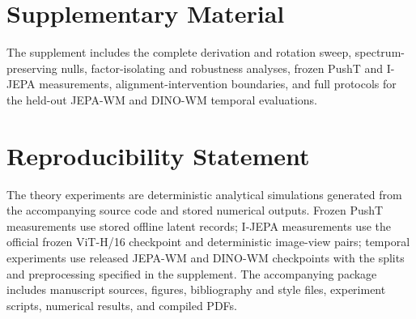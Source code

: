\documentclass{article}
\begin{document}
\section*{Supplementary Material}

The supplement includes the complete derivation and rotation sweep, spectrum-preserving nulls, factor-isolating and robustness analyses, frozen PushT and I-JEPA measurements, alignment-intervention boundaries, and full protocols for the held-out JEPA-WM and DINO-WM temporal evaluations.

\section*{Reproducibility Statement}

The theory experiments are deterministic analytical simulations generated from the accompanying source code and stored numerical outputs. Frozen PushT measurements use stored offline latent records; I-JEPA measurements use the official frozen ViT-H/16 checkpoint and deterministic image-view pairs; temporal experiments use released JEPA-WM and DINO-WM checkpoints with the splits and preprocessing specified in the supplement. The accompanying package includes manuscript sources, figures, bibliography and style files, experiment scripts, numerical results, and compiled PDFs.



\end{document}
